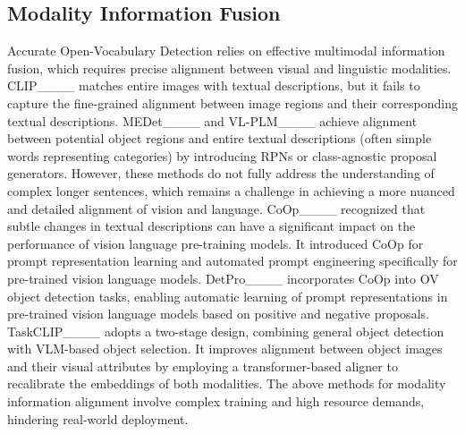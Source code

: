 \subsection{Modality Information Fusion}
Accurate Open-Vocabulary Detection relies on effective multimodal information fusion, which requires precise alignment between visual and linguistic modalities. CLIP____ matches entire images with textual descriptions, but it fails to capture the fine-grained alignment between image regions and their corresponding textual descriptions. MEDet____ and VL-PLM____ achieve alignment between potential object regions and entire textual descriptions (often simple words representing categories) by introducing RPNs or class-agnostic proposal generators. However, these methods do not fully address the understanding of complex longer sentences, which remains a challenge in achieving a more nuanced and detailed alignment of vision and language. CoOp____ recognized that subtle changes in textual descriptions can have a significant impact on the performance of vision language pre-training models. It introduced CoOp for prompt representation learning and automated prompt engineering specifically for pre-trained vision language models. DetPro____ incorporates CoOp into OV object detection tasks, enabling automatic learning of prompt representations in pre-trained vision language models based on positive and negative proposals. TaskCLIP____ adopts a two-stage design, combining general object detection with VLM-based object selection. It improves alignment between object images and their visual attributes by employing a transformer-based aligner to recalibrate the embeddings of both modalities. The above methods for modality information alignment involve complex training and high resource demands, hindering real-world deployment.